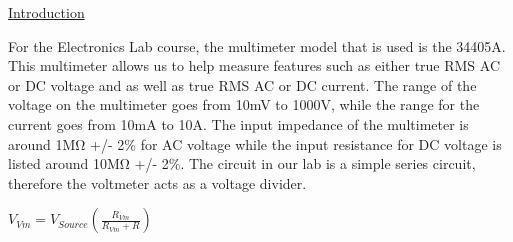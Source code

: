 \documentclass[a4paper,10pt]{article}
\begin{document}
\underline{Introduction}

For the Electronics Lab course, the multimeter model that is used is the 34405A. This multimeter allows us to help measure features such as either true RMS AC or DC voltage and as well as true RMS AC or DC current. The range of the voltage on the multimeter goes from 10mV to 1000V, while the range for the current goes from 10mA to 10A. The input impedance of the multimeter is around 1M\si{\ohm} +/- 2\% for AC voltage while the input resistance for DC voltage is listed around 10M\si{\ohm} +/- 2\%. The circuit in our lab is a simple series circuit, therefore the voltmeter acts as a voltage divider.\\
\centerline{ $ V_{Vm} = V_{Source}(\frac{R_{Vm}}{R_{Vm} + R}) $}
\end{document}
